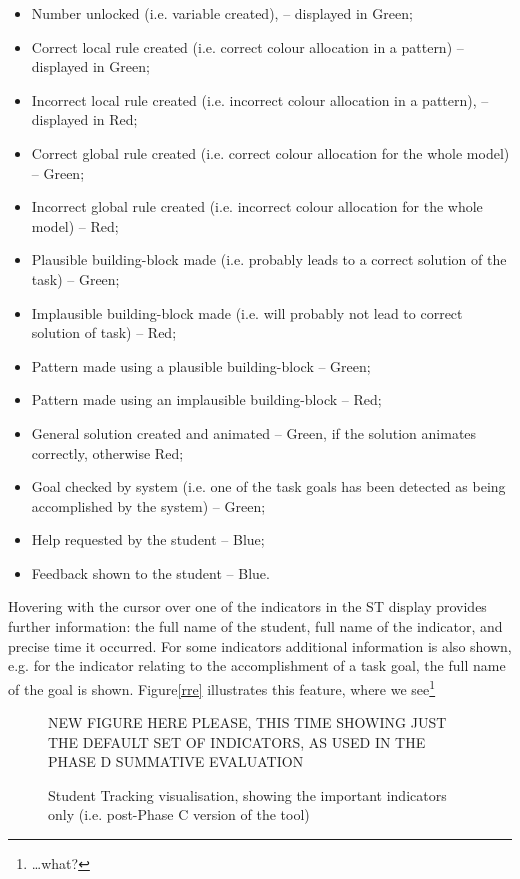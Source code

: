 \begin{itemize}
        	\item Number unlocked (i.e. variable created), – displayed in Green;
        	\item Correct local rule created (i.e. correct colour
              allocation in a pattern) – displayed in Green;
        	\item Incorrect local rule created (i.e. incorrect colour
              allocation in a pattern), – displayed in Red;
        	\item Correct global rule created (i.e. correct colour
              allocation for the whole model) – Green;
        	\item Incorrect global rule created (i.e. incorrect colour
              allocation for the whole model) – Red;
        	\item Plausible building-block made (i.e. probably leads
              to a correct solution of the task) – Green;
        	\item Implausible building-block made (i.e. will probably
              not lead to correct solution of task) – Red;
        	\item Pattern made using a plausible building-block – Green; 
        	\item Pattern made using an implausible building-block –
              Red;
        	\item General solution created and animated – Green, if
              the solution animates correctly, otherwise Red;
        	\item Goal checked by system (i.e. one of the task goals
              has been detected as being accomplished by the system) –
              Green;
        	\item Help requested by the student – Blue; 
        	\item Feedback shown to the student – Blue.
  \end{itemize}
 
Hovering with the cursor over one of the indicators in the ST display
provides further  information: the full name of the student, full name
of the indicator, and precise time it occurred. For some indicators
additional information is also shown, e.g. for the indicator relating
to the accomplishment of a task goal, the full name of the goal is
shown.  Figure\ref{rre} illustrates this feature, where we
see\footnote{\ldots what?}

\begin{figure}[htbp]
  \centering 
  NEW FIGURE HERE PLEASE, THIS TIME SHOWING JUST THE
  DEFAULT SET OF INDICATORS, AS USED IN THE PHASE D SUMMATIVE
  EVALUATION
  \caption{Student Tracking visualisation, showing the important
    indicators only (i.e. post-Phase C version of the tool)}
  \label{fig:stex}
\end{figure}

